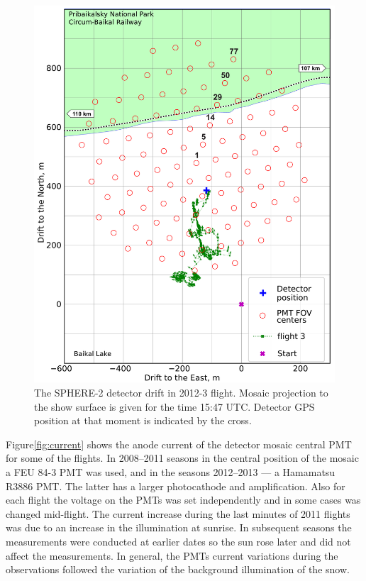 \documentclass[universe,article,submit,moreauthors,pdftex]{Definitions/mdpi}
\begin{document}
\begin{paracol}{2}
\begin{figure}[tb]
\begin{minipage}[t]{0.48\textwidth}
        \includegraphics[width=\textwidth]{2012_drift-mod.pdf}
        \caption{The SPHERE-2 detector drift in 2012-3 flight. Mosaic projection to the show surface is given for the time 15:47 UTC. Detector GPS position at that moment is indicated by the cross.}
        \label{fig:2012-drift}
    \end{minipage}
\end{figure}


 Figure\ref{fig:current} shows the anode current of the detector mosaic central PMT for some of the flights. In 2008--2011 seasons in the central position of the mosaic a FEU 84-3 PMT was used, and in the seasons 2012--2013 --- a Hamamatsu R3886 PMT. The latter has a larger photocathode and amplification. Also for each flight the voltage on the PMTs was set independently and in some cases was changed mid-flight. The current increase during the last minutes of 2011 flights was due to an increase in the illumination at sunrise. In subsequent seasons the measurements were conducted at earlier dates so the sun rose later and did not affect the measurements. In general, the PMTs current variations during the observations followed the variation of the background illumination of the snow.



\end{paracol}
\end{document}
